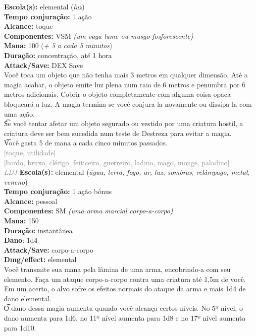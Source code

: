 \documentclass{RPG_Adventure}[2021/10/20]
\begin{document}
{\small \t \textbf{Escola(s):} elemental (\textit{luz})\\\t \textbf{Tempo conjuração:} 1 ação\\\t \textbf{Alcance:} toque\\\t \textbf{Componentes:} VSM \textit{(um vaga-lume ou musgo fosforescente)}\\\t \textbf{Mana:} 100 (\textit{+ 5 a cada 5 minutos})\\\t \textbf{Duração:} concentração, até 1 hora\\\t \textbf{Attack/Save:} DEX Save\\}
{\normalsize Você toca um objeto que não tenha mais 3 metros em qualquer dimensão. Até a magia acabar, o objeto emite luz plena num raio de 6 metros e penumbra por 6 metros adicionais. Cobrir o objeto completamente com alguma coisa opaca bloqueará a luz. A magia termina se você conjura-la novamente ou dissipa-la com uma ação.\\\t Se você tentar afetar um objeto segurado ou vestido por uma criatura hostil, a criatura deve ser bem sucedida num teste de Destreza para evitar a magia.\\\t Você gasta 5 de mana a cada cinco minutos passados.\\}
{\scriptsize \textcolor{gray}{[toque, utilidade]\\}}
{\scriptsize \textcolor{gray}{[bardo, bruxo, clérigo, feiticeiro, guerreiro, ladino, mago, monge, paladino]\\}}
{\tiny \textcolor{gray}{\textit{LDJ}}}
{\small \t \textbf{Escola(s):} elemental (\textit{água, terra, fogo, ar, luz, sombras, relâmpago, metal, veneno})\\\t \textbf{Tempo conjuração:} 1 ação bônus\\\t \textbf{Alcance:} pessoal\\\t \textbf{Componentes:} SM \textit{(uma arma marcial corpo-a-corpo)}\\\t \textbf{Mana:} 150\\\t \textbf{Duração:} instantânea\\\t \textbf{Dano}: 1d4\\\t \textbf{Attack/Save:} corpo-a-corpo\\\t \textbf{Dmg/effect:} elemental\\}
{\normalsize Você transmite sua mana pela lâmina de uma arma, encobrindo-a com seu elemento. Faça um ataque corpo-a-corpo contra uma criatura até 1,5m de você. Em um acerto, o alvo sofre os efeitos normais do ataque da arma e mais 1d4 de dano elemental.\\\t O dano dessa magia aumenta quando você alcança certos níveis. No 5º nível, o dano aumenta para 1d6, no 11º nível aumenta para 1d8 e no 17º nível aumenta para 1d10.\\}
\end{document}
